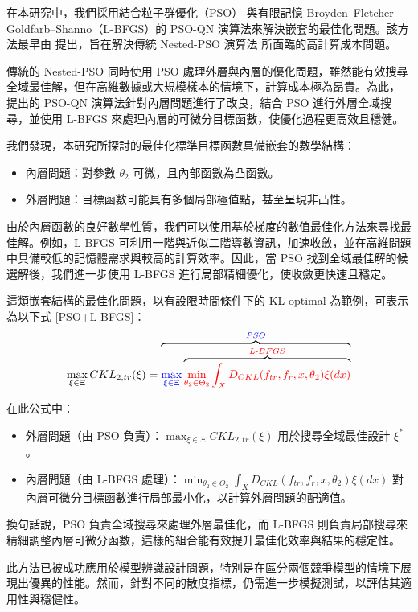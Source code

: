 \hspace*{8mm} 在本研究中，我們採用結合粒子群優化（PSO） 與有限記憶 Broyden–Fletcher–Goldfarb–Shanno（L-BFGS）的 PSO-QN 演算法來解決嵌套的最佳化問題。該方法最早由 \cite{chen2020hybrid} 提出，旨在解決傳統 Nested-PSO 演算法\citep{chen2015minimax} 所面臨的高計算成本問題。

\hspace*{8mm} 傳統的 Nested-PSO \citep{chen2015minimax} 同時使用 PSO 處理外層與內層的優化問題，雖然能有效搜尋全域最佳解，但在高維數據或大規模樣本的情境下，計算成本極為昂貴。為此，\cite{chen2020hybrid} 提出的 PSO-QN 演算法針對內層問題進行了改良，結合 PSO 進行外層全域搜尋，並使用 L-BFGS 來處理內層的可微分目標函數，使優化過程更高效且穩健。

我們發現，本研究所探討的最佳化標準目標函數具備嵌套的數學結構：
\begin{itemize}
\item 內層問題：對參數 $\theta_2$ 可微，且內部函數為凸函數。
\item 外層問題：目標函數可能具有多個局部極值點，甚至呈現非凸性。
\end{itemize}

由於內層函數的良好數學性質，我們可以使用基於梯度的數值最佳化方法來尋找最佳解。例如，L-BFGS 可利用一階與近似二階導數資訊，加速收斂，並在高維問題中具備較低的記憶體需求與較高的計算效率。因此，當 PSO 找到全域最佳解的候選解後，我們進一步使用 L-BFGS 進行局部精細優化，使收斂更快速且穩定。

這類嵌套結構的最佳化問題，以有設限時間條件下的 KL-optimal 為範例，可表示為以下式 \eqref{PSO+L-BFGS}：
\begin{equation} \label{PSO+L-BFGS}
\max_{\xi\in \Xi} CKL_{2,tr}(\xi)=\overbrace{\textcolor{blue}{\max_{\xi\in \Xi}} \overbrace{\textcolor{red}{\min_{\substack{\theta_2\in \Theta_2}}\int_{X}D_{CKL}(f_{tr},f_r,x,\theta_2) \xi(dx)}}^{\textcolor{red}{L\text{-}BFGS}}}^{\textcolor{blue}{PSO}}
\end{equation}

在此公式中：

\begin{itemize}
\item 外層問題（由 PSO 負責）：$\max_{\xi\in \Xi} CKL_{2,tr}(\xi)$ 用於搜尋全域最佳設計 $\xi^*$。
\item 內層問題（由 L-BFGS 處理）：$\min_{\theta_2\in \Theta_2}\int_{X}D_{CKL}(f_{tr},f_r,x,\theta_2) \xi(dx)$ 對內層可微分目標函數進行局部最小化，以計算外層問題的配適值。
\end{itemize}

換句話說，PSO 負責全域搜尋來處理外層最佳化，而 L-BFGS 則負責局部搜尋來精細調整內層可微分函數，這樣的組合能有效提升最佳化效率與結果的穩定性。

此方法已被成功應用於模型辨識設計問題，特別是在區分兩個競爭模型的情境下展現出優異的性能。然而，針對不同的散度指標，仍需進一步模擬測試，以評估其適用性與穩健性。